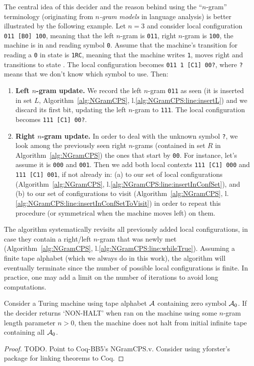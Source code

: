 The central idea of this decider and the reason behind using the ``$n$-gram'' terminology (originating from \textit{$n$-gram models} in language analysis)  is better illustrated by the following example. Let $n=3$ and consider local configuration \texttt{011 [B0] 100}, meaning that the left $n$-gram is \texttt{011}, right $n$-gram is \texttt{100}, the machine is in \stateB and reading symbol \texttt{0}. Assume that the  machine's transition for reading a \texttt{0} in state \stateB is \texttt{1RC}, meaning that the machine writes \texttt{1}, moves right and transitions to state \stateC. The local configuration becomes \texttt{011 1 [C1] 00?}, where \texttt{?} means that we don't know which symbol to use. Then:

\begin{enumerate}
    \item \textbf{Left $n$-gram update.} We record the left $n$-gram \texttt{011} as seen (it is inserted in set $L$, Algorithm~\ref{alg:NGramCPS}, l.\ref{alg:NGramCPS:line:insertL}) and we discard its first bit, updating the left $n$-gram to \texttt{111}. The local configuration becomes \texttt{111 [C1] 00?}.
    \item \textbf{Right $n$-gram update.} In order to deal with the unknown symbol \texttt{?}, we look among the previously seen right $n$-grams (contained in set $R$ in Algorithm~\ref{alg:NGramCPS}) the ones that start by \texttt{00}. For instance, let's assume it is \texttt{000} and \texttt{001}. Then we add both local contexts \texttt{111 [C1] 000} and \texttt{111 [C1] 001}, if not already in: (a) to our set of local configurations (Algorithm~\ref{alg:NGramCPS}, l.\ref{alg:NGramCPS:line:insertInConfSet}), and (b) to our set of configurations to visit (Algorithm~\ref{alg:NGramCPS}, l.\ref{alg:NGramCPS:line:insertInConfSetToVisit}) in order to repeat this procedure (or symmetrical when the machine moves left) on them.
\end{enumerate}

The algorithm systematically revisits all previously added local configurations, in case they contain a right/left $n$-gram that was newly met (Algorithm~\ref{alg:NGramCPS}, l.\ref{alg:NGramCPS:line:whileTrue}). Assuming a finite tape alphabet (which we always do in this work), the algorithm will eventually terminate since the number of possible local configurations is finite. In practice, one may add a limit on the number of iterations to avoid long computations.

\begin{theorem}
    Consider a Turing machine using tape alphabet $\mathcal{A}$ containing zero symbol $\mathcal{A}_0$. If the \ngramcps decider returns `NON-HALT' when ran on the machine using some $n$-gram length parameter $n > 0$, then the machine does not halt from initial infinite tape containing all $\mathcal{A}_0$.
\end{theorem}
\begin{proof}
    TODO. Point to Coq-BB5's NGramCPS.v. Consider using yforster's package for linking theorems to Coq.
\end{proof}



